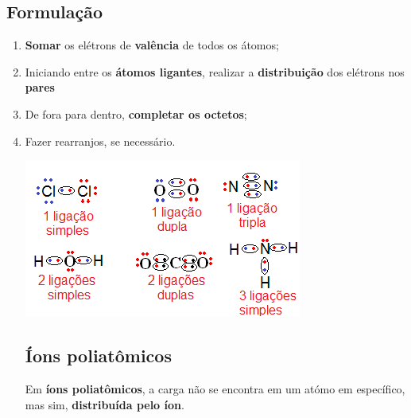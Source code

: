 \documentclass{article}
\begin{document}
\subsection{Formulação}
\begin{enumerate}
    \item \textbf{Somar} os elétrons de \textbf{valência} de todos os átomos;
    \item Iniciando entre os \textbf{átomos ligantes}, realizar a \textbf{distribuição} dos elétrons nos \textbf{pares}
    \item De fora para dentro, \textbf{completar os octetos};
    \item Fazer rearranjos, se necessário.

\begin{center}
    \includegraphics{ligacoes_covalentes}
\end{center}

\subsection{Íons poliatômicos}
Em \textbf{íons poliatômicos}, a carga não se encontra em um atómo em específico, mas sim,
\textbf{distribuída pelo íon}.

\end{enumerate}
\end{document}
